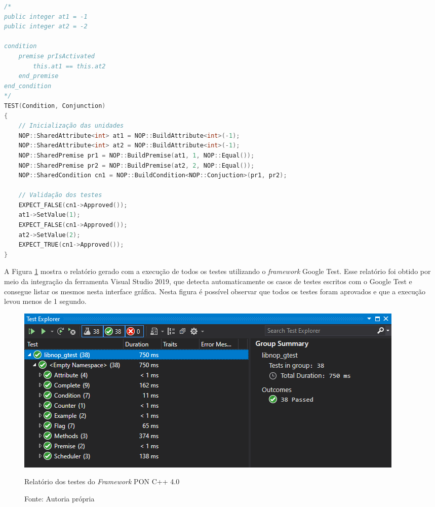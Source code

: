 \begin{lstlisting}[caption = {Caso de teste para \textit{Condition} do \textit{Framework} PON C++ 4.0},
source = {Autoria própria}, float=htb, language=C++,
label = {cod:test_cn},
]
/*
public integer at1 = -1
public integer at2 = -2

condition
    premise prIsActivated
        this.at1 == this.at2
    end_premise
end_condition
*/
TEST(Condition, Conjunction)
{
    // Inicialização das unidades
    NOP::SharedAttribute<int> at1 = NOP::BuildAttribute<int>(-1);
    NOP::SharedAttribute<int> at2 = NOP::BuildAttribute<int>(-1);
    NOP::SharedPremise pr1 = NOP::BuildPremise(at1, 1, NOP::Equal());
    NOP::SharedPremise pr2 = NOP::BuildPremise(at2, 2, NOP::Equal());
    NOP::SharedCondition cn1 = NOP::BuildCondition<NOP::Conjuction>(pr1, pr2);

    // Validação dos testes
    EXPECT_FALSE(cn1->Approved());
    at1->SetValue(1);
    EXPECT_FALSE(cn1->Approved());
    at2->SetValue(2);
    EXPECT_TRUE(cn1->Approved());
}
\end{lstlisting}

\FloatBarrier

A Figura \ref{fig:graph_tests} mostra o relatório gerado com a execução de todos
os testes utilizando o \textit{framework} Google Test. Esse relatório foi obtido
por meio da integração da ferramenta Visual Studio 2019, que detecta
automaticamente os casos de testes escritos com o Google Test e consegue listar
os mesmos nesta interface gráfica. Nesta figura é possível observar que todos os
testes foram aprovados e que a execução levou menos de 1 segundo. 

\begin{figure}[!htb]
\centering
\includegraphics[width=\textwidth]{../figures/gtest_020421.png}
\smallskip
\caption{Relatório dos testes do \textit{Framework} PON C++ 4.0}
\caption*{Fonte: Autoria própria}
\label{fig:graph_tests}
\end{figure}

